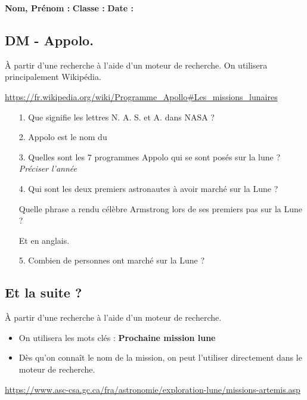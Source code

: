 



\textbf{Nom, Prénom :} \hspace{8cm} \textbf{Classe :} \hspace{3cm} \textbf{Date :}\\

\subsection*{DM - Appolo.}

À partir d'une recherche à l'aide d'un moteur de recherche. On utilisera principalement Wikipédia.

\url{https://fr.wikipedia.org/wiki/Programme_Apollo#Les_missions_lunaires}


\begin{enumerate}
  \item[1.]Que signifie les lettres N. A. S. et A. dans NASA ? \\
  \Pointilles[2]

  \item[2.]Appolo est le nom du \dotfill
  
  \item[3.]Quelles sont les 7 programmes Appolo qui se sont posés sur la lune ? \textit{Préciser l'année} \\
  \Pointilles[4]

  \item[4.]Qui sont les deux premiers astronautes à avoir marché sur la Lune ? \\
  \Pointilles[1]

  Quelle phrase a rendu célèbre Armstrong lors de ses premiers pas sur la Lune ? \\
  \Pointilles[2]

  Et en anglais. \\
  \Pointilles[2]

  \item[5.]Combien de personnes ont marché sur la Lune ? \\
  \Pointilles[3]
\end{enumerate}

\subsection*{Et la suite ?}

À partir d'une recherche à l'aide d'un moteur de recherche. 

\begin{itemize}
  \item On utilisera les mots clés : \textbf{Prochaine mission lune}
  \item Dès qu'on connaît le nom de la mission, on peut l'utiliser directement dans le moteur de recherche.
\end{itemize}
\url{https://www.asc-csa.gc.ca/fra/astronomie/exploration-lune/missions-artemis.asp}

